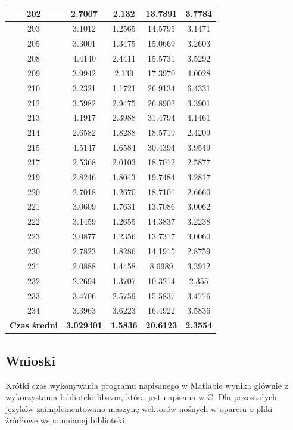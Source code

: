 \begin{table}[!tp]
\begin{tabular}{|c|c|c|c|c|}
		202 & 2.7007 & 2.132  & 13.7891 & 3.7784\\ \hline
		203 & 3.1012 & 1.2565 & 14.5795 & 3.1471\\ \hline
		205 & 3.3001 & 1.3475 & 15.0669 & 3.2603\\ \hline
		208 & 4.4140 & 2.4411 & 15.5731 & 3.5292\\ \hline
		209 & 3.9942 & 2.139  & 17.3970 & 4.0028\\ \hline	
		210 & 3.2321 & 1.1721 & 26.9134 & 6.4331\\ \hline
		212 & 3.5982 & 2.9475 & 26.8902 & 3.3901\\ \hline
		213 & 4.1917 & 2.3988 & 31.4794 & 4.1461\\ \hline
		214 & 2.6582 & 1.8288 & 18.5719 & 2.4209\\ \hline
		215 & 4.5147 & 1.6584 & 30.4394 & 3.9549\\ \hline
		217 & 2.5368 & 2.0103 & 18.7012 & 2.5877\\ \hline
		219 & 2.8246 & 1.8043 & 19.7484 & 3.2817\\ \hline
		220 & 2.7018 & 1.2670 & 18.7101 & 2.6660\\ \hline		
		221 & 3.0609 & 1.7631 & 13.7086 & 3.0062\\ \hline
		222 & 3.1459 & 1.2655 & 14.3837 & 3.2238\\ \hline
		223 & 3.0877 & 1.2356 & 13.7317 & 3.0060\\ \hline
		230 & 2.7823 & 1.8286 & 14.1915 & 2.8759\\ \hline
		231 & 2.0888 & 1.4458 &  8.6989 & 3.3912\\ \hline
		232 & 2.2694 & 1.3707 & 10.3214  & 2.355\\ \hline
		233 & 3.4706 & 2.5759 & 15.5837 & 3.4776\\ \hline
		234 & 3.3963 & 3.6223 & 16.4922 & 3.5836\\ \hline
		\textbf{Czas średni} & \textbf{3.029401} & \textbf{1.5836} & \textbf{20.6123} & \textbf{2.3554}\\ \hline
	\end{tabular}
\end{table}

\subsection{Wnioski}
\label{sub:wnioski}

\qquad Krótki czas wykonywania programu napisanego w Matlabie wynika głównie z wykorzystania biblioteki libsvm, która jest napisana w C. Dla pozostałych języków zaimplementowano maszynę wektorów nośnych w oparciu o pliki źródłowe wspomnianej biblioteki.

